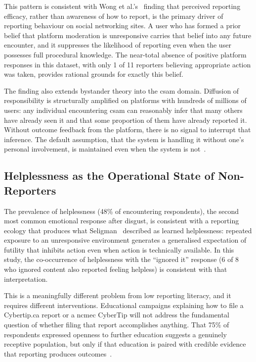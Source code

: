 \documentclass{ieee-portfolio}
\begin{document}
This pattern is consistent with Wong et al.'s~\cite{wong_combating_2016} finding that perceived reporting efficacy, rather than awareness of how to report, is the primary driver of reporting behaviour on social networking sites. A user who has formed a prior belief that platform moderation is unresponsive carries that belief into any future encounter, and it suppresses the likelihood of reporting even when the user possesses full procedural knowledge. The near-total absence of positive platform responses in this dataset, with only 1 of 11 reporters believing appropriate action was taken, provides rational grounds for exactly this belief.
 
The finding also extends bystander theory into the \gls{csam} domain. Diffusion of responsibility is structurally amplified on platforms with hundreds of millions of users: any individual encountering \gls{csam} can reasonably infer that many others have already seen it and that some proportion of them have already reported it. Without outcome feedback from the platform, there is no signal to interrupt that inference. The default assumption, that the system is handling it without one's personal involvement, is maintained even when the system is not~\cite{latane_unresponsive_1970,jeyagobi_factors_2022}.
 
\subsection{Helplessness as the Operational State of Non-Reporters}
 
The prevalence of helplessness (48\% of encountering respondents), the second most common emotional response after disgust, is consistent with a reporting ecology that produces what Seligman~\cite{seligman_helplessness_1975} described as learned helplessness: repeated exposure to an unresponsive environment generates a generalised expectation of futility that inhibits action even when action is technically available. In this study, the co-occurrence of helplessness with the ``ignored it'' response (6 of 8 who ignored content also reported feeling helpless) is consistent with that interpretation.
 
This is a meaningfully different problem from low reporting literacy, and it requires different interventions. Educational campaigns explaining how to file a Cybertip.ca report or a \gls{ncmec} CyberTip will not address the fundamental question of whether filing that report accomplishes anything. That 75\% of respondents expressed openness to further education suggests a genuinely receptive population, but only if that education is paired with credible evidence that reporting produces outcomes~\cite{wong_combating_2016}.
\end{document}
